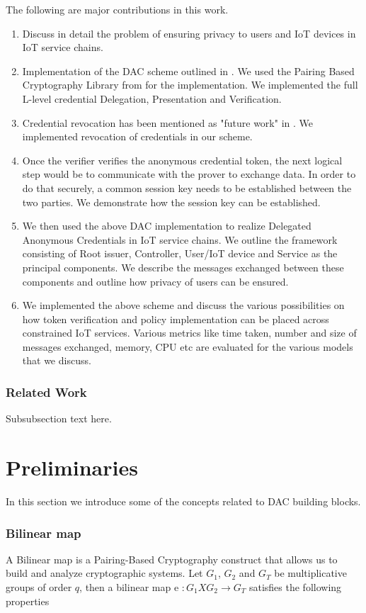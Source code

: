 \documentclass[journal]{IEEEtran}
\begin{document}
The following are major contributions in this work.
\begin{enumerate}[label=\alph*)]
	\item Discuss in detail the problem of ensuring privacy to users and IoT devices in IoT service chains.
	\item Implementation of the DAC scheme outlined in \cite{CamenischDD17}. We used the Pairing Based Cryptography Library from \cite{pbc} for the implementation. We implemented the full L-level credential Delegation, Presentation and Verification.
	\item Credential revocation has been mentioned as "future work" in \cite{CamenischDD17}. We implemented revocation of credentials in our scheme.
	\item Once the verifier verifies the anonymous credential token, the next logical step would be to communicate with the prover to exchange data. In order to do that securely, a common session key needs to be established between the two parties. We demonstrate how the session key can be established.
	\item We then used the above DAC implementation to realize Delegated Anonymous Credentials in IoT service chains. We outline the framework consisting of Root issuer, Controller, User/IoT device and Service as the principal components. We describe the messages exchanged between these components and outline how privacy of users can be ensured.
	\item We implemented the above scheme and discuss the various possibilities on how token verification and policy implementation can be placed across constrained IoT services. Various metrics like time taken, number and size of messages exchanged, memory, CPU etc are evaluated for the various models that we discuss. 
\end{enumerate}

\subsubsection{Related Work}
Subsubsection text here.

\section{Preliminaries}
In this section we introduce some of the concepts related to DAC building blocks. 

\subsubsection{Bilinear map}
A Bilinear map is a Pairing-Based Cryptography construct that allows us to build and analyze cryptographic systems. Let $G_1$, $G_2$  and $G_T$ be multiplicative groups of order $q$, then a bilinear map e $: G_1 X G_2\rightarrow G_T$ satisfies the following properties
\end{document}

